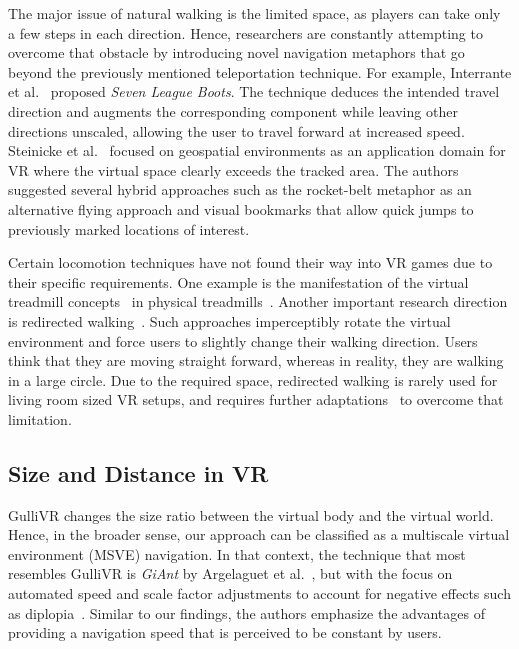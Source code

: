 \documentclass{sigchi}
\begin{document}
The major issue of natural walking is the limited space, as players can take only a few steps in each direction. Hence, researchers are constantly attempting to overcome that obstacle by introducing novel navigation metaphors that go beyond the previously mentioned teleportation technique. For example, Interrante et al.~\cite{interrante2007seven} proposed \textit{Seven League Boots}. The technique deduces the intended travel direction and augments the corresponding component while leaving other directions unscaled, allowing the user to travel forward at increased speed. Steinicke et al.~\cite{steinicke2007hybrid} focused on geospatial environments as an application domain for VR where the virtual space clearly exceeds the tracked area. The authors suggested several hybrid approaches such as the rocket-belt metaphor as an alternative flying approach and visual bookmarks that allow quick jumps to previously marked locations of interest.

Certain locomotion techniques have not found their way into VR games due to their specific requirements. One example is the manifestation of the virtual treadmill concepts~\cite{slater1995virtual} in physical treadmills~\cite{Darken:1997:OTL:263407.263550, omni}. Another important research direction is redirected walking~\cite{razzaque2001redirected, razzaque2005redirected}. Such approaches imperceptibly rotate the virtual environment and force users to slightly change their walking direction. Users think that they are moving straight forward, whereas in reality, they are walking in a large circle. Due to the required space, redirected walking is rarely used for living room sized VR setups, and requires further adaptations~\cite{Grechkin:2016:RDT:2931002.2931018, engel2008psychophysically, langbehn2016subliminal,bruder2009arch} to overcome that limitation. 



\subsection{Size and Distance in VR}

GulliVR changes the size ratio between the virtual body and the virtual world. Hence, in the broader sense, our approach can be classified as a multiscale virtual environment (MSVE) navigation. In that context, the technique that most resembles GulliVR is \textit{GiAnt} by Argelaguet et al.~\cite{argelaguet2016giant}, but with the focus on automated speed and scale factor adjustments to account for negative effects such as diplopia~\cite{lambooij2009visual}. Similar to our findings, the authors emphasize the advantages of providing a navigation speed that is perceived to be constant by users.
\end{document}
